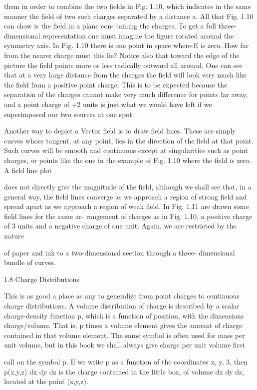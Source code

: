 them in order to combine the two fields in Fig. 1.10, which indicates
in the same manner the field of two such charges separated by a
distance a. All that Fig. 1.10 can show is the field in a plane con-
taining the charges. To get a full three-dimensional representation
one must imagine the figure rotated around the symmetry axis. In
Fig. 1.10 there is one point in space where-E is zero. How far from
the nearer charge must this lie? Notice also that toward the edge of
the picture the field points more or less radically outward all around.
One can see that at a very large distance from the charges the field
will look very much like the field from a positive point charge. This
is to be expected because the separation of the charges cannot make
very much difference for points far away, and a point charge of +2
units is just what we would have left if we superimposed our two
sources at one spot.

Another way to depict a Vector field is to draw field lines. These
are simply curves whose tangent, at any point, lies in the direction of
the field at that point. Such curves will be smooth and continuous
except at singularities such as point charges, or points like the one
in the example of Fig. 1.10 where the field is zero. A field line plot

does not directly give the magnitude of the field, although we shall
see that, in a general way, the field lines converge as we approach a
region of strong field and spread apart as we approach a region of
weak field. In Fig. 1.11 are drawn some field lines for the same ar-
rangement of charges as in Fig. 1.10, a positive charge of 3 units and
a negative charge of one unit. Again, we are restricted by the nature

of paper and ink to a two-dimensional section through a three-
dimensional bundle of curves.

1.8 Charge Distributions

This is as good a place as any to generalize from point charges to
continuous charge distributions. A volume distribution of charge is
described by a scalar charge-density function p, which is a function
of position, with the dimensions charge/volume. That is, p times a
volume element gives the amount of charge contained in that volume
element. The same symbol is often used for mass per unit volume,
but in this book we shall always give charge per unit volume first

call on the symbol p. If we write p as a function of the coordinates
x, y, 3, then p(x,y,z) dx dy dz is the charge contained in the little box,
of volume dx dy dz, located at the point (x,y,z).

